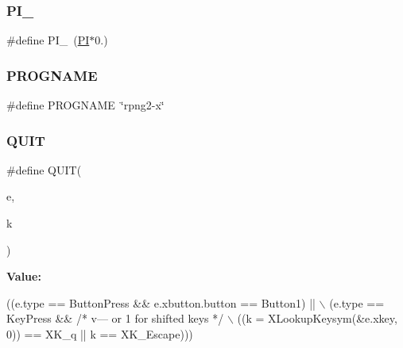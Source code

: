 \mbox{\label{rpng2-x_8c_a7c7671235d3f0d09bc5c011920fe0d5b}} 
\subsubsection{\texorpdfstring{P\+I\+\_}{PI\_2}}
{\footnotesize\ttfamily \#define P\+I\+\_~(\mbox{\hyperlink{rpng2-x_8c_a598a3330b3c21701223ee0ca14316eca}{PI}}$\ast$0.)}

\mbox{\label{rpng2-x_8c_a8c9afb758de9a0355c93fc926b8ce6b1}} 
\subsubsection{\texorpdfstring{P\+R\+O\+G\+N\+A\+ME}{PROGNAME}}
{\footnotesize\ttfamily \#define P\+R\+O\+G\+N\+A\+ME~\char`\"{}rpng2-\/x\char`\"{}}

\mbox{\label{rpng2-x_8c_ad76830d9084202349fd77f494a991ce4}} 
\subsubsection{\texorpdfstring{Q\+U\+IT}{QUIT}}
{\footnotesize\ttfamily \#define Q\+U\+IT(\begin{DoxyParamCaption}\item[{}]{e,  }\item[{}]{k }\end{DoxyParamCaption})}

{\bfseries Value\+:}
\begin{DoxyCode}
((e.type == ButtonPress && e.xbutton.button == Button1) ||  \(\backslash\)
                  (e.type == KeyPress &&   \textcolor{comment}{/*  v--- or 1 for shifted keys */}  \(\backslash\)
                  ((k = XLookupKeysym(&e.xkey, 0)) == XK\_q || k == XK\_Escape)))
\end{DoxyCode}
\mbox{\label{rpng2-x_8c_a3b0a2ac91fca697e3acedd9903efd4fd}} 
